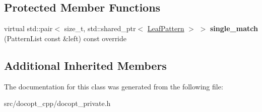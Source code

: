 \subsection*{Protected Member Functions}
\begin{DoxyCompactItemize}
\item 
\mbox{\label{classdocopt_1_1Argument_ab5ebe9ed80895111207a63feeca50f6f}} 
virtual std\+::pair$<$ size\+\_\+t, std\+::shared\+\_\+ptr$<$ \hyperlink{classdocopt_1_1LeafPattern}{Leaf\+Pattern} $>$ $>$ {\bfseries single\+\_\+match} (Pattern\+List const \&left) const override
\end{DoxyCompactItemize}
\subsection*{Additional Inherited Members}


The documentation for this class was generated from the following file\+:\begin{DoxyCompactItemize}
\item 
src/docopt\+\_\+cpp/docopt\+\_\+private.\+h\end{DoxyCompactItemize}
